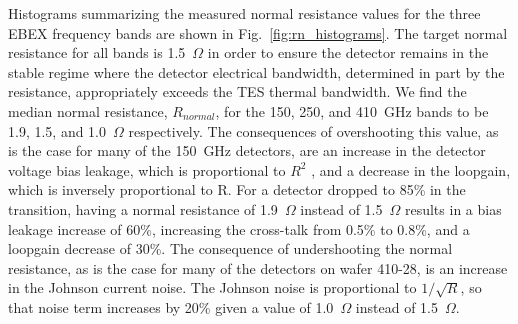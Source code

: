 \documentclass[../EBEXPaper2.tex]{subfiles}
\begin{document}
Histograms summarizing the measured normal resistance values for the three \ac{EBEX} frequency bands are shown in Fig.~\ref{fig:rn_histograms}. 
The target normal resistance for all bands is 1.5~$\Omega$ in order to ensure the detector remains in the stable regime where the detector electrical bandwidth, determined in part by the resistance, appropriately exceeds the \ac{TES} thermal bandwidth. 
We find the median normal resistance, $R_{normal}$, for the 150, 250, and 410~GHz bands to be 1.9, 1.5, and 1.0~$\Omega$ respectively. 
The consequences of overshooting this value, as is the case for many of the 150~GHz detectors, are an increase in the detector voltage bias leakage, which is proportional to $R^2$ \citep{dobbs_revSciInst_2012}, and a decrease in the loopgain, which is inversely proportional to R. 
For a detector dropped to 85\% in the transition, having a normal resistance of 1.9~$\Omega$ instead of 1.5~$\Omega$ results in a bias leakage increase of 60\%, increasing the cross-talk from 0.5\% to 0.8\%, and a loopgain decrease of 30\%. 
The consequence of undershooting the normal resistance, as is the case for many of the detectors on wafer 410-28, is an increase in the Johnson current noise. The Johnson noise is proportional to $1/\sqrt{R}$, so that noise term increases by 20\% given a value of 1.0~$\Omega$ instead of 1.5~$\Omega$.

\end{document}
